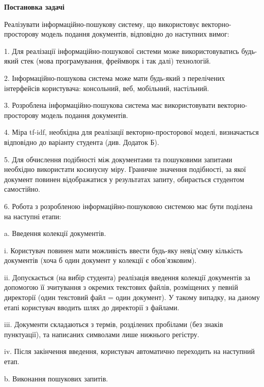 \documentclass{../../templates/information_retrieval_lab}
\begin{document}


\newcommand{\labNo}{2}

\newcommand{\labTopic}{РЕАЛІЗАЦІЯ АЛГЕБРАЇЧНОЇ МОДЕЛІ ПОДАННЯ ДОКУМЕНТІВ}



\centerline{\textbf{Постановка задачі}}

Реалізувати інформаційно-пошукову систему, що використовує векторно-
просторову модель подання документів, відповідно до наступних вимог:

1. Для реалізації інформаційно-пошукової системи може
використовуватись будь-який стек (мова програмування, фреймворк і
так далі) технологій.

2. Інформаційно-пошукова система може мати будь-який з перелічених
інтерфейсів користувача: консольний, веб, мобільний, настільний.

3. Розроблена інформаційно-пошукова система має використовувати
векторно-просторову модель подання документів.

4. Міра tf-idf, необхідна для реалізації векторно-просторової моделі,
визначається відповідно до варіанту студента (див. Додаток Б).

5. Для обчислення подібності між документами та пошуковими запитами
необхідно використати косинусну міру. Граничне значення подібності, за якої документ повинен відображатися у результатах запиту,
обирається студентом самостійно.

6. Робота з розробленою інформаційно-пошуковою системою має бути
поділена на наступні етапи:

a. Введення колекції документів.

i. Користувач повинен мати можливість ввести будь-яку
невід’ємну кількість документів (хоча б один документ у колекції
є обов’язковим).

ii. Допускається (на вибір студента) реалізація введення колекції
документів за допомогою її зчитування з окремих текстових
файлів, розміщених у певній директорії (один текстовий файл =
один документ). У такому випадку, на даному етапі користувач
вводить шлях до директорії з файлами.

iii. Документи складаються з термів, розділених пробілами (без
знаків пунктуації), та написаних символами лише нижнього
регістру.

iv. Після закінчення введення, користувач автоматично переходить
на наступний етап.

b. Виконання пошукових запитів.
\end{document}
